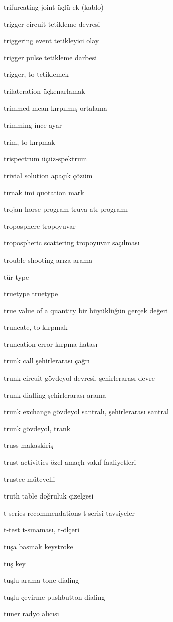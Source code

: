 \documentclass[12pt,fleqn]{article}\usepackage{../../common}
\begin{document}
trifurcating joint üçlü ek (kablo)

trigger circuit tetikleme devresi

triggering event tetikleyici olay

trigger pulse tetikleme darbesi

trigger, to tetiklemek

trilateration üçkenarlamak

trimmed mean kırpılmış ortalama

trimming ince ayar

trim, to kırpmak

trispectrum üçüz-spektrum

trivial solution apaçık çözüm

tırnak imi quotation mark

trojan horse program truva atı programı

troposphere tropoyuvar

tropospheric scattering tropoyuvar saçılması

trouble shooting arıza arama

tür type

truetype truetype

true value of a quantity bir büyüklüğün gerçek değeri

truncate, to kırpmak

truncation error kırpma hatası

trunk call şehirlerarası çağrı

trunk circuit gövdeyol devresi, şehirlerarası devre

trunk dialling şehirlerarası arama

trunk exchange gövdeyol santralı, şehirlerarası santral

trunk gövdeyol, trank

truss makaskiriş

trust activities özel amaçlı vakıf faaliyetleri

trustee mütevelli

truth table doğruluk çizelgesi

t-series recommendations t-serisi tavsiyeler

t-test t-sınaması, t-ölçeri

tuşa basmak keystroke

tuş key

tuşlu arama tone dialing

tuşlu çevirme pushbutton dialing

tuner radyo alıcısı
\end{document}
